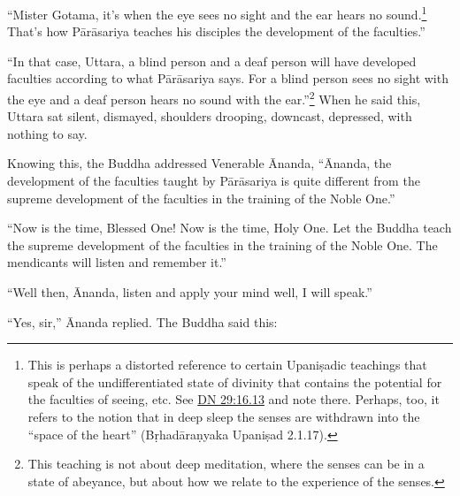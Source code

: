 \documentclass[12pt,openany]{book}%
\begin{document}
“Mister Gotama, it’s when the eye sees no sight and the ear hears no sound.\footnote{This is perhaps a distorted reference to certain \textsanskrit{Upaniṣadic} teachings that speak of the undifferentiated state of divinity that contains the potential for the faculties of seeing, etc. See \href{https://suttacentral.net/dn29/en/sujato\#16.13}{DN 29:16.13} and note there. Perhaps, too, it refers to the notion that in deep sleep the senses are withdrawn into the “space of the heart” (\textsanskrit{Bṛhadāraṇyaka} \textsanskrit{Upaniṣad} 2.1.17). } That’s how \textsanskrit{Pārāsariya} teaches his disciples the development of the faculties.” 

“In that case, Uttara, a blind person and a deaf person will have developed faculties according to what \textsanskrit{Pārāsariya} says. For a blind person sees no sight with the eye and a deaf person hears no sound with the ear.”\footnote{This teaching is not about deep meditation, where the senses can be in a state of abeyance, but about how we relate to the experience of the senses. } When he said this, Uttara sat silent, dismayed, shoulders drooping, downcast, depressed, with nothing to say. 

Knowing this, the Buddha addressed Venerable Ānanda, “Ānanda, the development of the faculties taught by \textsanskrit{Pārāsariya} is quite different from the supreme development of the faculties in the training of the Noble One.” 

“Now is the time, Blessed One! Now is the time, Holy One. Let the Buddha teach the supreme development of the faculties in the training of the Noble One. The mendicants will listen and remember it.” 

“Well then, Ānanda, listen and apply your mind well, I will speak.” 

“Yes, sir,” Ānanda replied. The Buddha said this: 
\end{document}
